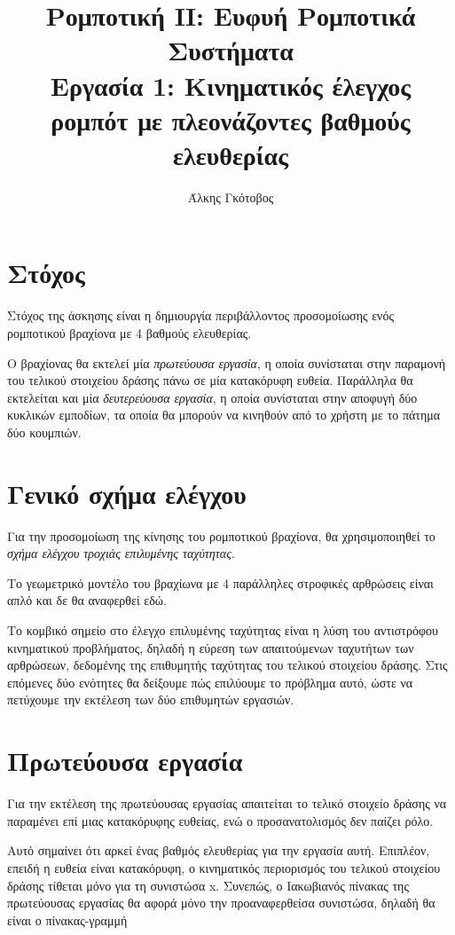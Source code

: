 \documentclass[a4paper, 11pt, english, greek]{article}
\title{Ρομποτική ΙΙ: Ευφυή Ρομποτικά Συστήματα \\ \vspace{12pt}
Εργασία 1: Κινηματικός έλεγχος ρομπότ με πλεονάζοντες βαθμούς ελευθερίας}
\author{Άλκης Γκότοβος}
\begin{document}
\begin{titlepage}
	\maketitle
	\thispagestyle{empty}
\end{titlepage}

\section{Στόχος}
Στόχος της άσκησης είναι η δημιουργία περιβάλλοντος προσομοίωσης ενός ρομποτικού βραχίονα με 4 βαθμούς ελευθερίας.

Ο βραχίονας θα εκτελεί μία \emph{πρωτεύουσα εργασία}, η οποία συνίσταται στην παραμονή του τελικού στοιχείου
δράσης πάνω σε μία κατακόρυφη ευθεία.
Παράλληλα θα εκτελείται και μία \emph{δευτερεύουσα εργασία}, η οποία συνίσταται στην αποφυγή δύο κυκλικών εμποδίων,
τα οποία θα μπορούν να κινηθούν από το χρήστη με το πάτημα δύο κουμπιών.

\section{Γενικό σχήμα ελέγχου}
Για την προσομοίωση της κίνησης του ρομποτικού βραχίονα, θα χρησιμοποιηθεί το \emph{σχήμα ελέγχου τροχιάς επιλυμένης
ταχύτητας}.

Το γεωμετρικό μοντέλο του βραχίωνα με 4 παράλληλες στροφικές αρθρώσεις είναι απλό και δε θα αναφερθεί εδώ.

Το κομβικό σημείο στο έλεγχο επιλυμένης ταχύτητας είναι η λύση του αντιστρόφου κινηματικού προβλήματος, δηλαδή
η εύρεση των απαιτούμενων ταχυτήτων των αρθρώσεων, δεδομένης της επιθυμητής ταχύτητας του τελικού στοιχείου δράσης.
Στις επόμενες δύο ενότητες θα δείξουμε πώς επιλύουμε το πρόβλημα αυτό, ώστε να πετύχουμε την εκτέλεση των δύο
επιθυμητών εργασιών.

\section{Πρωτεύουσα εργασία}
Για την εκτέλεση της πρωτεύουσας εργασίας απαιτείται το τελικό στοιχείο δράσης να παραμένει επί μιας κατακόρυφης
ευθείας, ενώ ο προσανατολισμός δεν παίζει ρόλο.

Αυτό σημαίνει ότι αρκεί ένας βαθμός ελευθερίας για την εργασία αυτή.
Επιπλέον, επειδή η ευθεία είναι κατακόρυφη, ο κινηματικός περιορισμός του τελικού στοιχείου δράσης τίθεται μόνο
για τη συνιστώσα \textlatin{x}.
Συνεπώς, ο Ιακωβιανός πίνακας της πρωτεύουσας εργασίας θα αφορά μόνο την προαναφερθείσα συνιστώσα, δηλαδή θα είναι
ο πίνακας-γραμμή
\end{document}
